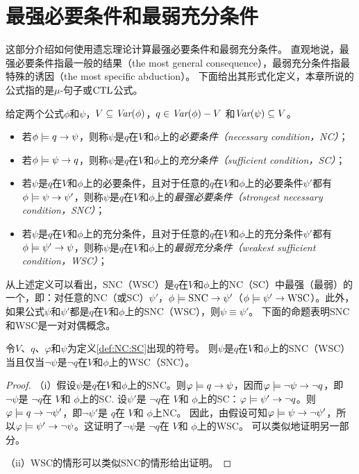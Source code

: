 \section{最强必要条件和最弱充分条件}\label{chapter07:sec:snc}
这部分介绍如何使用遗忘理论计算最强必要条件和最弱充分条件。
直观地说，最强必要条件指最一般的结果（the most general consequence），最弱充分条件指最特殊的诱因（the most specific abduction）。
下面给出其形式化定义，本章所说的公式指的是$\mu$-句子或$\textrm{CTL}$公式。
\begin{definition}[充分和必要条件]\label{def:NC:SC}
	给定两个公式$\phi$和$\psi$，$V \subseteq \textit{Var}(\phi)$，$q\in\textit{Var}(\phi)- V$
	和$\textit{Var}(\psi)\subseteq V$。
	\begin{itemize}
		\item 若$\phi \models q \rightarrow \psi$，则称$\psi$是$q$在$V$和$\phi$上的{\em 必要条件（necessary condition，NC）}；
		\item 若$\phi \models \psi\rightarrow q$，则称$\psi$是$q$在$V$和$\phi$上的{\em 充分条件（sufficient condition，SC）}；
		\item 若$\psi$是$q$在$V$和$\phi$上的必要条件，且对于任意的$q$在$V$和$\phi$上的必要条件$\psi'$都有$\phi\models\psi\rightarrow\psi'$，则称$\psi$是$q$在$V$和$\phi$上的{\em 最强必要条件（strongest necessary condition，SNC）}；
		\item 若$\psi$是$q$在$V$和$\phi$上的充分条件，且对于任意的$q$在$V$和$\phi$上的充分条件$\psi'$都有$\phi\models\psi'\rightarrow\psi$，则称$\psi$是$q$在$V$和$\phi$上的{\em 最弱充分条件（weakest sufficient condition，WSC）}；
	\end{itemize}
\end{definition}

从上述定义可以看出，SNC（WSC）是$q$在$V$和$\phi$上的NC（SC）中最强（最弱）的一个，即：对任意的NC（或SC）$\psi'$，$\phi \models \hbox{SNC} \rightarrow \psi'$（$\phi \models \psi' \rightarrow \hbox{WSC}$）。此外，如果公式$\psi$和$\psi'$都是$q$在$V$和$\phi$上的SNC（WSC），则$\psi \equiv \psi'$。
下面的命题表明SNC和WSC是一对对偶概念。

\begin{proposition}[对偶性]\label{dual}
	令$V$、$q$、$\varphi$和$\psi$为定义\ref{def:NC:SC}出现的符号。
	则$\psi$是$q$在$V$和$\phi$上的SNC（WSC）当且仅当$\neg \psi$是$\neg q$在$V$和$\phi$上的WSC（SNC）。
\end{proposition}
\begin{proof}
	（i）假设$\psi$是$q$在$V$和$\phi$上的SNC。则$\varphi \models q \rightarrow \psi$，因而$\varphi \models \neg \psi \rightarrow \neg q$，即 $\neg \psi$是 $\neg q$在 $V$和 $\phi$上的SC. 设$\psi'$是 $\neg q$在 $V$和 $\phi$上的SC：$\varphi \models \psi' \rightarrow \neg q$。则$\varphi \models q \rightarrow \neg \psi'$，即$\neg \psi'$是 $q$在 $V$和 $\phi$上NC。
	因此，由假设可知$\varphi \models \psi \rightarrow \neg \psi'$，所以$\varphi \models \psi' \rightarrow \neg \psi$。这证明了$\neg \psi$是 $\neg q$在 $V$和 $\phi$上的WSC。
可以类似地证明另一部分。
	
	（ii）WSC的情形可以类似SNC的情形给出证明。
\end{proof}

